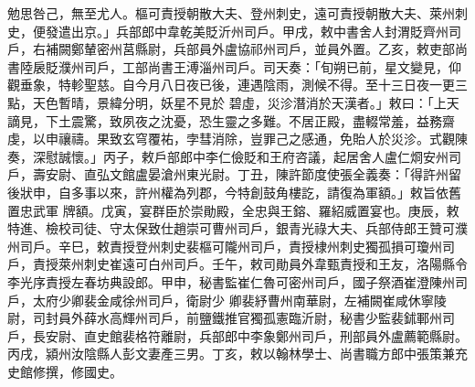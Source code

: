 \begin{pinyinscope}
 勉思咎己，無至尤人。樞可責授朝散大夫、登州刺史，遠可責授朝散大夫、萊州刺史，便發遣出京。」兵部郎中韋乾美貶沂州司戶。甲戌，敕中書舍人封渭貶齊州司戶，右補闕鄭輦密州莒縣尉，兵部員外盧協祁州司戶，並員外置。乙亥，敕吏部尚書陸扆貶濮州司戶，工部尚書王溥淄州司戶。司天奏：「旬朔已前，星文變見，仰觀垂象，特軫聖慈。自今月八日夜已後，連遇陰雨，測候不得。至十三日夜一更三點，天色暫晴，景緯分明，妖星不見於
 碧虛，災沴潛消於天漢者。」敕曰：「上天謫見，下土震驚，致夙夜之沈憂，恐生靈之多難。不居正殿，盡輟常羞，益務齋虔，以申禳禱。果致玄穹覆祐，孛彗消除，豈罪己之感通，免貽人於災沴。式觀陳奏，深慰誠懷。」丙子，敕戶部郎中李仁儉貶和王府咨議，起居舍人盧仁烱安州司戶，壽安尉、直弘文館盧晏滄州東光尉。丁丑，陳許節度使張全義奏：「得許州留後狀申，自多事以來，許州權為列郡，今特創鼓角樓訖，請復為軍額。」敕旨依舊置忠武軍
 牌額。戊寅，宴群臣於崇勛殿，全忠與王鎔、羅紹威置宴也。庚辰，敕特進、檢校司徒、守太保致仕趙崇可曹州司戶，銀青光祿大夫、兵部侍郎王贊可濮州司戶。辛巳，敕責授登州刺史裴樞可隴州司戶，責授棣州刺史獨孤損可瓊州司戶，責授萊州刺史崔遠可白州司戶。壬午，敕司勛員外韋甄責授和王友，洛陽縣令李光序責授左春坊典設郎。甲申，秘書監崔仁魯可密州司戶，國子祭酒崔澄陳州司戶，太府少卿裴金咸徐州司戶，衛尉少
 卿裴紓曹州南華尉，左補闕崔咸休寧陵尉，司封員外薛水高輝州司戶，前鹽鐵推官獨孤憲臨沂尉，秘書少監裴鉥鄆州司戶，長安尉、直史館裴格符離尉，兵部郎中李象鄭州司戶，刑部員外盧薦範縣尉。丙戌，潁州汝陰縣人彭文妻產三男。丁亥，敕以翰林學士、尚書職方郎中張策兼充史館修撰，修國史。




\end{pinyinscope}
